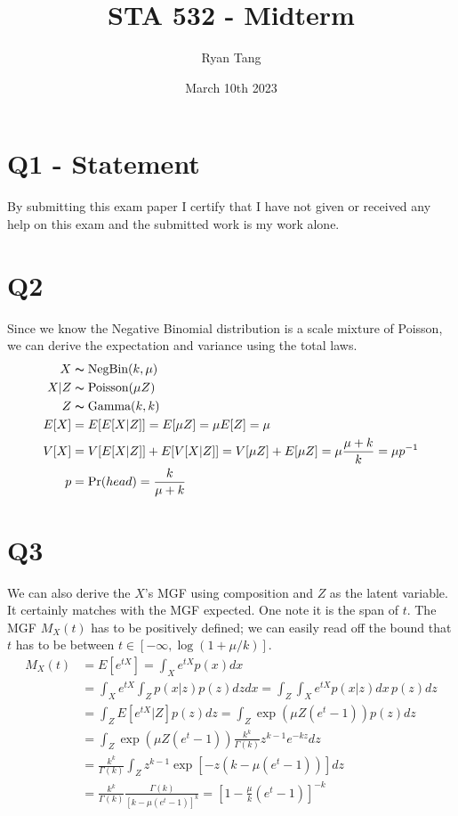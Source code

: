 \documentclass[11pt, letterpaper]{article}
\author{Ryan Tang}
\title{STA 532 - Midterm}
\date{March 10th 2023}
\begin{document}
\maketitle

\section{Q1 - Statement}
By submitting this exam paper I certify that I have not given or received any help
on this exam and the submitted work is my work alone.

\section{Q2}
Since we know the Negative Binomial distribution is a scale mixture of Poisson, we can derive the expectation and variance using the total laws. 
\begin{align*}
    X &\thicksim \text{NegBin}(k, \mu) \\
    X|Z &\thicksim \text{Poisson}(\mu Z) \\
    Z &\thicksim \text{Gamma}(k, k) \\
    E[X] &= E[E[X|Z]] = E[\mu Z] = \mu E[Z] = \mu \\
    V[X] &= V[E[X|Z]] + E[V[X|Z]] = V[\mu Z] + E[\mu Z] = \mu \frac{\mu+k}{k} = \mu p^{-1} \\
    p &= \text{Pr}(head) = \frac{k}{\mu + k}
\end{align*}

\section{Q3}
We can also derive the $X$'s MGF using composition and $Z$ as the latent variable. It certainly matches with the MGF expected. One note it is the span of $t$. The MGF $M_X(t)$ has to be positively defined; we can easily read off the bound that $t$ has to be between $t \in [-\infty, \log(1+\mu/k)]$.
\begin{align*}
    M_X(t) &= E[e^{tX}] = \int_X e^{tX} p(x) dx \\
        &= \int_X e^{tX} \int_Z p(x|z) p(z) dz dx = \int_Z \int_X e^{tX} p(x|z) dx \, p(z) dz \\
        &= \int_Z E[e^{tX}|Z] p(z) dz = \int_Z \exp(\mu Z(e^t - 1)) p(z) dz \\
        &= \int_Z \exp(\mu Z(e^t - 1)) \frac{k^k}{\Gamma(k)} z^{k-1} e^{-kz} dz \\
        &= \frac{k^k}{\Gamma(k)} \int_Z z^{k-1} \exp[-z (k-\mu(e^t -1))] dz \\
        &= \frac{k^k}{\Gamma(k)} \frac{\Gamma(k)}{[k-\mu(e^t-1)]^k} = [1 - \frac{\mu}{k}(e^t-1)]^{-k}
\end{align*}
\end{document}
